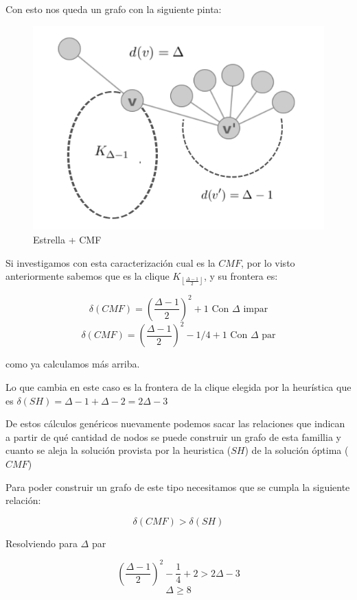 Con esto nos queda un grafo con la siguiente pinta:
\begin{figure}[H]
\caption{Estrella + CMF}
\label{fig:ecmf_carac}
\begin{center} 
	\includegraphics[scale = 0.5]{img/ej3/constructiva_golosa/vincmf_carac.png} 
\end{center}
\end{figure}


Si investigamos con esta caracterizaci\'on cual es la $CMF$, por lo visto anteriormente
sabemos que es la clique $K_{\left\lfloor \frac{\Delta -1}{2} \right\rfloor}$, 
y su frontera es:

\[ \boxed{\delta(CMF) = (\frac{\Delta -1}{2})^2 +1} \text{ Con $\Delta$ impar} \]
\[ \boxed{\delta(CMF) = (\frac{\Delta -1 }{2})^2 -1/4 +1} \text{ Con $\Delta$ par}\]

como ya calculamos m\'as arriba.

Lo que cambia en este caso es la frontera de la clique elegida por la heur\'istica
que es $\delta(SH) = \Delta -1 + \Delta -2 = 2 \Delta -3$

De estos c\'alculos gen\'ericos nuevamente podemos sacar las relaciones que indican
a partir de qu\'e cantidad de nodos se puede construir un grafo de esta famillia
y cuanto se aleja la soluci\'on provista por la heuristica ($SH$) de la soluci\'on 
\'optima ($CMF$)

Para poder construir un grafo de este tipo necesitamos que se cumpla la siguiente 
relaci\'on:

\[ \delta(CMF) > \delta(SH) \]

Resolviendo para $\Delta$ par

\[ (\frac{\Delta -1}{2})^2 -\frac{1}{4} + 2 > 2 \Delta -3 \]
\[ \Delta \geq 8 \]


